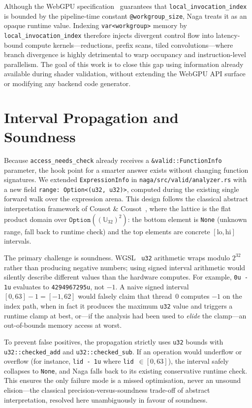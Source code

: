 \documentclass[10pt,a4paper,twocolumn]{article}
\begin{document}
Although the WebGPU specification~\cite{webgpu} guarantees that
\texttt{local\_invocation\_index} is bounded by the pipeline-time constant
\texttt{@workgroup\_size}, Naga treats it as an opaque runtime value. Indexing
\texttt{var<workgroup>} memory by \texttt{local\_invocation\_index} therefore
injects divergent control flow into latency-bound compute kernels---reductions,
prefix scans, tiled convolutions---where branch divergence is highly
detrimental to warp occupancy and instruction-level parallelism. The goal of
this work is to close this gap using information already available during
shader validation, without extending the WebGPU API surface or modifying any
backend code generator.

\section{Interval Propagation and Soundness}

Because \texttt{access\_needs\_check} already receives a
\texttt{\&valid::FunctionInfo} parameter, the hook point for a smarter answer
exists without changing function signatures. We extended \texttt{ExpressionInfo}
in \texttt{naga/src/valid/analyzer.rs} with a new field
\texttt{range: Option<(u32, u32)>}, computed during the existing single forward
walk over the expression arena. This design follows the classical abstract
interpretation framework of Cousot \& Cousot~\cite{cousot1977}, where the
lattice is the flat product domain over $\texttt{Option}((\mathbb{U}_{32})^2)$:
the bottom element is \texttt{None} (unknown range, fall back to runtime check)
and the top elements are concrete $[\text{lo}, \text{hi}]$ intervals.

The primary challenge is soundness. WGSL~\cite{wgsl} \texttt{u32} arithmetic
wraps modulo $2^{32}$ rather than producing negative numbers; using signed
interval arithmetic would silently describe different values than the hardware
computes. For example, \texttt{0u - 1u} evaluates to \texttt{4294967295u}, not
$-1$. A naive signed interval $[0, 63] - 1 = [-1, 62]$ would falsely claim that
thread~0 computes $-1$ on the index path, when in fact it produces the maximum
\texttt{u32} value and triggers a runtime clamp at best, or---if the analysis
had been used to \emph{elide} the clamp---an out-of-bounds memory access at
worst.

To prevent false positives, the propagation strictly uses \texttt{u32} bounds
with \texttt{u32::checked\_add} and \texttt{u32::checked\_sub}. If an operation
would underflow or overflow (for instance, \texttt{lid - 1u} where
\texttt{lid}~$\in [0, 63]$), the interval safely collapses to \texttt{None},
and Naga falls back to its existing conservative runtime check. This ensures
the only failure mode is a missed optimisation, never an unsound elision---the
classical precision-versus-soundness trade-off of abstract interpretation,
resolved here unambiguously in favour of soundness.
\end{document}
